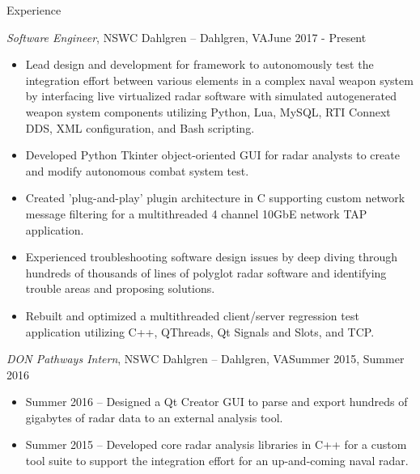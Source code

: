 \documentclass[calibri]{mcdowellcv}
\begin{document}
	\makeheader
	
	\begin{cvsection}{Experience}
		\begin{cvsubsection}{\textit{Software Engineer}, NSWC Dahlgren -- Dahlgren, VA}{June 2017 - Present}
			\begin{itemize}
				\item Lead design and development for framework to autonomously test the integration effort between various elements in a complex naval weapon system by interfacing live virtualized radar software with simulated autogenerated weapon system components utilizing Python, Lua, MySQL, RTI Connext DDS, XML configuration, and Bash scripting. 
				\item Developed Python Tkinter object-oriented GUI for radar analysts to create and modify autonomous combat system test.
				\item Created 'plug-and-play' plugin architecture in C supporting custom network message filtering for a multithreaded 4 channel 10GbE network TAP application.  
				\item Experienced troubleshooting software design issues by deep diving through hundreds of thousands of lines of polyglot radar software and identifying trouble areas and proposing solutions.  
				\item Rebuilt and optimized a multithreaded client/server regression test application utilizing C++, QThreads, Qt Signals and Slots, and TCP.   
			\end{itemize}
		\end{cvsubsection}
		
		\begin{cvsubsection}{\textit{DON Pathways Intern}, NSWC Dahlgren -- Dahlgren, VA}{Summer 2015, Summer 2016}	
			\begin{itemize}
				\item Summer 2016 -- Designed a Qt Creator GUI to parse and export hundreds of gigabytes of radar data to an external analysis tool.  
				\item Summer 2015 -- Developed core radar analysis libraries in C++ for a custom tool suite to support the integration effort for an up-and-coming naval radar.  
			\end{itemize}
		\end{cvsubsection}
	\end{cvsection}
	
\end{document}
